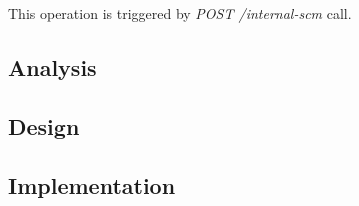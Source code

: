 \documentclass[../main.tex]{subfiles}
\begin{document}
This operation is triggered by \textit{POST /internal-scm} call.

\subsection{Analysis}


\subsection{Design}


\subsection{Implementation}

\end{document}
